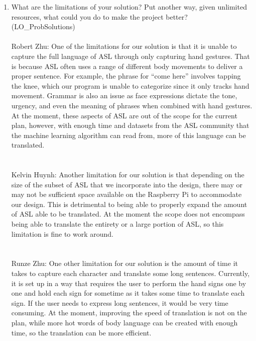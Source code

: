 \documentclass[12pt, titlepage]{article}
\begin{document}
\begin{enumerate}
  \item What are the limitations of your solution?  Put another way, given
  unlimited resources, what could you do to make the project better? (LO\_ProbSolutions)
  ~\\
  \\
  Robert Zhu: One of the limitations for our solution is that it is unable to capture the full language of ASL through only capturing hand gestures. 
  That is because ASL often uses a range of different body movements to deliver a proper sentence. For example, the phrase for “come here” involves 
  tapping the knee, which our program is unable to categorize since it only tracks hand movement. Grammar is also an issue as face expressions dictate 
  the tone, urgency, and even the meaning of phrases when combined with hand gestures. At the moment, these aspects of ASL are out of the scope for the 
  current plan, however, with enough time and datasets from the ASL community that the machine learning algorithm can read from, more of this language 
  can be translated.
  \\
  ~\\
  \\
  Kelvin Huynh: Another limitation for our solution is that depending on the size of the subset of ASL that we incorporate into the design, there may or 
  may not be sufficient space available on the Raspberry Pi to accommodate our design. This is detrimental to being able to properly expand the amount of 
  ASL able to be translated. At the moment the scope does not encompass being able to translate the entirety or a large portion of ASL, so this limitation 
  is fine to work around.
  \\
  ~\\
  \\
  Runze Zhu: One other limitation for our solution is the amount of time it takes to capture each character and translate some long sentences. Currently, it is set up in a way that requires the user to perform the hand signs one by one and hold each sign for sometime as  it takes some time to translate each sign. If the user needs to express long sentences, it would be very time consuming. At the moment, improving the speed of translation is not on the plan, while more hot words of body language can be created with enough time, so the translation can be more efficient.
   \\
  ~\\
  \\

\end{enumerate}
\end{document}
